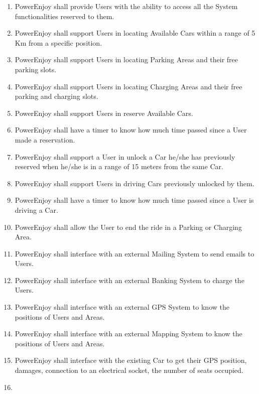 \documentclass{article}
\begin{document}
\begin{enumerate}[label=R\arabic*]
\item PowerEnjoy shall provide Users with the ability to access all the System functionalities reserved to them.
\item PowerEnjoy shall support Users in locating Available Cars within a range of 5 Km from a specific position.
\item PowerEnjoy shall support Users in locating Parking Areas and their free parking slots.
\item PowerEnjoy shall support Users in locating Charging Areas and their free parking and charging slots.
\item PowerEnjoy shall support Users in reserve Available Cars.
\item PowerEnjoy shall have a timer to know how much time passed since a User made a reservation.
\item PowerEnjoy shall support a User in unlock a Car he/she has previously reserved when he/she is in a range of 15 meters from the same Car.
\item PowerEnjoy shall support Users in driving Cars previously unlocked by them.
\item PowerEnjoy shall have a timer to know how much time passed since a User is driving a Car.
\item PowerEnjoy shall allow the User to end the ride in a Parking or Charging Area.
\item PowerEnjoy shall interface with an external Mailing System to send emails to Users.
\item PowerEnjoy shall interface with an external Banking System to charge the Users.
\item PowerEnjoy shall interface with an external GPS System to know the positions of Users and Areas.
\item PowerEnjoy shall interface with an external Mapping System to know the positions of Users and Areas.
\item PowerEnjoy shall interface with the existing Car to get their GPS position, damages, connection to an electrical socket, the number of seats occupied.
\item 
\end{enumerate}
\end{document}
